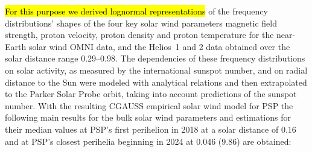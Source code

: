 \hl{For this purpose we derived lognormal representations } of the frequency distributions’ shapes of the four key solar wind parameters magnetic field strength, proton velocity, proton density and proton temperature for the near-Earth solar wind OMNI data, and the Helios~1 and 2 data obtained over the solar distance range \SIrange{0.29}{0.98}{\au}. The dependencies of these frequency distributions on solar activity, as measured by the international sunspot number, and on radial distance to the Sun were modeled with analytical relations and then extrapolated to the Parker Solar Probe orbit, taking into account predictions of the sunspot number. With the resulting CGAUSS empirical solar wind model for PSP the following main results for the bulk solar wind parameters and estimations for their median values at PSP’s first perihelion in 2018 at a solar distance of \SI{0.16}{\au} and at PSP’s closest perihelia beginning in 2024 at \SI{0.046}{\au} (\SI{9.86}{\Rs}) are obtained:
